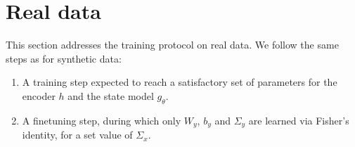 \documentclass[10pt,a4paper]{report}
\begin{document}
\section{Real data}
This section addresses the training protocol on real data.
We follow the same steps as for synthetic data:

\begin{enumerate}
	\item A training step expected to reach a satisfactory set of parameters for the encoder $h$ and the state model $g_\theta$.
	\item A finetuning step, during which only $W_y$, $b_y$ and $\Sigma_y$ are learned via Fisher's identity, for a set value of $\Sigma_x$.
\end{enumerate}
\end{document}
